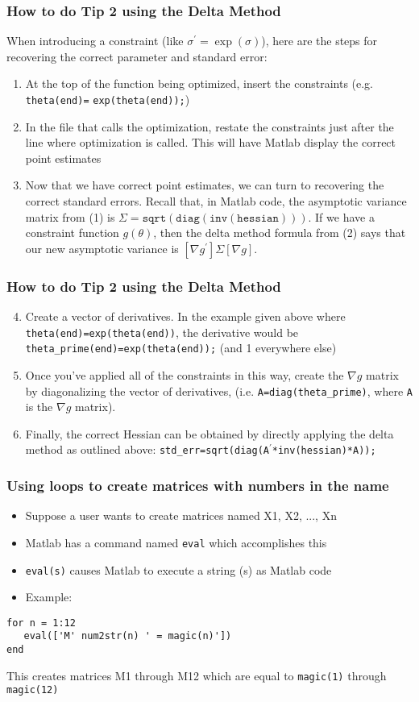 \documentclass[english,xcolor=dvipsnames]{beamer}
\newcommand{\be}{\begin{enumerate}}
\newcommand{\ee}{\end{enumerate}}
\newcommand{\bi}{\begin{itemize}}
\newcommand{\ei}{\end{itemize}}
\begin{document}
\begin{frame}
\frametitle{How to do Tip 2 using the Delta Method}
When introducing a constraint (like $\sigma^{\prime} = \exp(\sigma)$), here are the steps for recovering the correct parameter and standard error:
   \be
   \item At the top of the function being optimized, insert the constraints (e.g. \texttt{theta(end)=} \texttt{exp(theta(end));})
   \item In the file that calls the optimization, restate the constraints just after the line where optimization is called. This will have Matlab display the correct point estimates
   \item Now that we have correct point estimates, we can turn to recovering the correct standard errors. Recall that, in Matlab code, the asymptotic variance matrix from (1) is $\Sigma=\mathtt{sqrt(diag(inv(hessian)))}$. If we have a constraint function $g(\theta)$, then the delta method formula from (2) says that our new asymptotic variance is $[\nabla g^\prime] \Sigma [\nabla g]$.
   \ee
\end{frame}

\begin{frame}
\frametitle{How to do Tip 2 using the Delta Method}
   \be
   \setcounter{enumi}{3}
	 \item Create a vector of derivatives. In the example given above where \texttt{theta(end)=exp(theta(end))}, the derivative would be \texttt{theta\_prime(end)=exp(theta(end));} (and 1 everywhere else)
	 \item	Once you've applied all of the constraints in this way, create the $\nabla g$ matrix by diagonalizing the vector of derivatives, (i.e. \texttt{A=diag(theta\_prime)}, where \texttt{A} is the $\nabla g$ matrix).	
	 \item Finally, the correct Hessian can be obtained by directly applying the delta method as outlined above: \texttt{std\_err=sqrt(diag(A$^\prime$*inv(hessian)*A));}
   \ee
\end{frame}

\begin{frame}[fragile]
\frametitle{Using loops to create matrices with numbers in the name}
   \bi
	 \item Suppose a user wants to create matrices named X1, X2, ..., Xn
	 \item Matlab has a command named \texttt{eval} which accomplishes this
	 \item \texttt{eval(s)} causes Matlab to execute a string (s) as Matlab code
	 \item Example:	
   \ei
\begin{lstlisting}
for n = 1:12
   eval(['M' num2str(n) ' = magic(n)'])
end
\end{lstlisting}
This creates matrices M1 through M12 which are equal to \texttt{magic(1)} through \texttt{magic(12)}
\end{frame}
\end{document}
